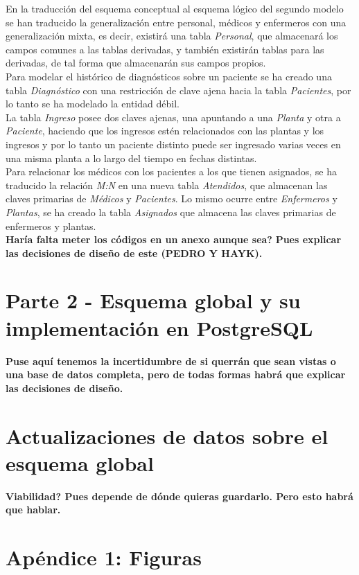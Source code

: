 \documentclass{article}
\begin{document}
En la traducción del esquema conceptual al esquema lógico del segundo modelo se han traducido la generalización entre personal, médicos y enfermeros con una generalización mixta, es decir, existirá una tabla \emph{Personal}, que almacenará los campos comunes a las tablas derivadas, y también existirán tablas para las derivadas, de tal forma que almacenarán sus campos propios.\\
Para modelar el histórico de diagnósticos sobre un paciente se ha creado una tabla \emph{Diagnóstico} con una restricción de clave ajena hacia la tabla \emph{Pacientes}, por lo tanto se ha modelado la entidad débil.\\
La tabla \emph{Ingreso} posee dos claves ajenas, una apuntando a una \emph{Planta} y otra a \emph{Paciente}, haciendo que los ingresos estén relacionados con las plantas y los ingresos y por lo tanto un paciente distinto puede ser ingresado varias veces en una misma planta a lo largo del tiempo en fechas distintas.\\
Para relacionar los médicos con los pacientes a los que tienen asignados, se ha traducido la relación \emph{M:N} en una nueva tabla \emph{Atendidos}, que almacenan las claves primarias de \emph{Médicos} y \emph{Pacientes}. Lo mismo ocurre entre \emph{Enfermeros} y \emph{Plantas}, se ha creado la tabla \emph{Asignados} que almacena las claves primarias de enfermeros y plantas.\\


\textbf{Haría falta meter los códigos en un anexo aunque sea?}
\textbf{Pues explicar las decisiones de diseño de este (PEDRO Y HAYK).}

\section{Parte 2 - Esquema global y su implementación en PostgreSQL}

\textbf{Puse aquí tenemos la incertidumbre de si querrán que sean vistas o una base de datos completa, pero de todas formas habrá que explicar las decisiones de diseño.}

\section{Actualizaciones de datos sobre el esquema global}

\textbf{Viabilidad? Pues depende de dónde quieras guardarlo. Pero esto habrá que hablar.}

\newpage
\section{Apéndice 1: Figuras}
\end{document}
